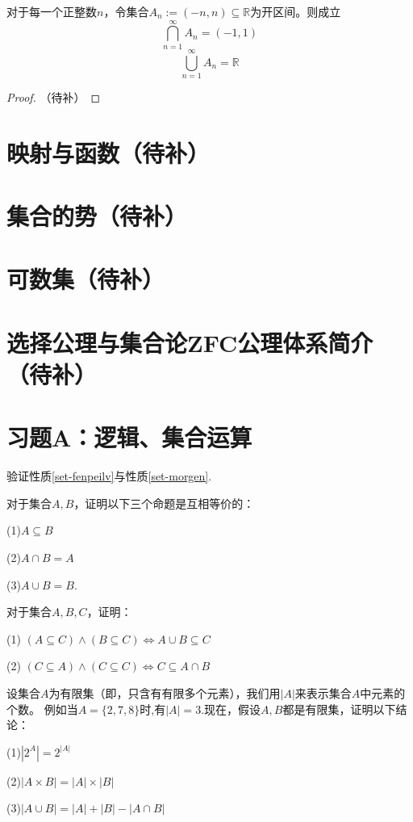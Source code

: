 \begin{example}
对于每一个正整数$n$，令集合$A_n:=(-n,n)\subseteq\mathbb{R}$为开区间。则成立
$$\bigcap_{n=1}^\infty A_n=(-1,1)$$
$$\bigcup_{n=1}^\infty A_n=\mathbb{R}$$
\end{example}
\begin{proof}
（待补）
\end{proof}

\section{映射与函数（待补）}
\section{集合的势（待补）}
\section{可数集（待补）}
\section{选择公理与集合论ZFC公理体系简介（待补）}
\section{习题A：逻辑、集合运算}

\begin{prob}验证性质\ref{set-fenpeilv}与性质\ref{set-morgen}.
\end{prob}\vs

\begin{prob}对于集合$A,B$，证明以下三个命题是互相等价的：

(1)$A\subseteq B$

(2)$A\cap B=A$

(3)$A\cup B=B$.
\end{prob}
\vs

\begin{prob}对于集合$A,B,C$，证明：

(1) $(A\subseteq C)\wedge(B\subseteq C)\Leftrightarrow A\cup B\subseteq C$

(2) $(C\subseteq A)\wedge(C\subseteq C)\Leftrightarrow C\subseteq A\cap B$
\end{prob}\vs

\begin{prob}[元素的个数]
设集合$A$为有限集（即，只含有有限多个元素），我们用$|A|$来表示集合$A$中元素的个数。
例如当$A=\{2,7,8\}$时,有$|A|=3$.现在，假设$A,B$都是有限集，证明以下结论：

(1)$|2^A|=2^{|A|}$

(2)$|A\times B|=|A|\times|B|$

(3)$|A\cup B|=|A|+|B|-|A\cap B|$
\end{prob}\vs


